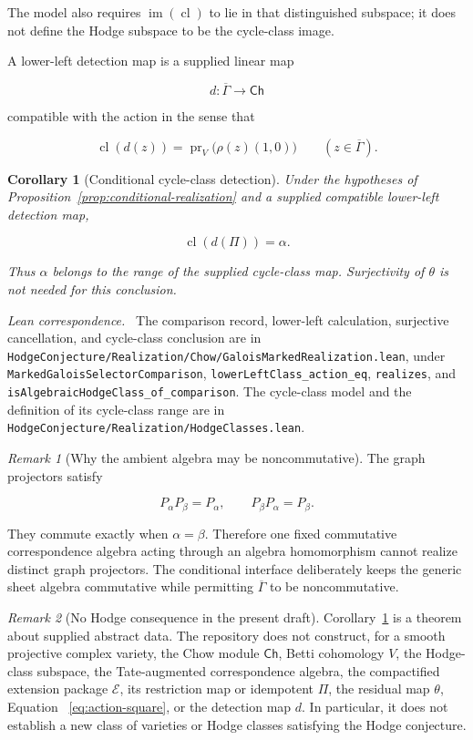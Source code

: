 \documentclass[11pt]{article}
\newtheorem{corollary}[theorem]{Corollary}
\theoremstyle{definition}
\theoremstyle{remark}
\newtheorem*{remark}{Remark}
\newcommand{\Gbar}{\overline{\Gamma}}
\newcommand{\leanpath}[1]{\texttt{\nolinkurl{#1}}}
\newcommand{\chowsrc}[1]{%
  \leanpath{HodgeConjecture/Realization/Chow/#1}}
\newenvironment{leanfiles}
  {\par\medskip\begingroup\footnotesize\raggedright\noindent
   \textit{Lean correspondence.}\ }
  {\par\endgroup\medskip}
\begin{document}
The model also requires
\(\operatorname{im}(\operatorname{cl})\) to lie in that distinguished
subspace; it does not define the Hodge subspace to be the cycle-class image.

A lower-left detection map is a supplied linear map

\[
  d:\Gbar\longrightarrow\mathsf{Ch}
\]

compatible with the action in the sense that

\[
  \operatorname{cl}(d(z))
  =\operatorname{pr}_V\bigl(\rho(z)(1,0)\bigr)
  \qquad(z\in\Gbar).
\]

\begin{corollary}[Conditional cycle-class detection]
\label{cor:conditional-detection}
Under the hypotheses of Proposition~\ref{prop:conditional-realization} and a
supplied compatible lower-left detection map,

\[
  \operatorname{cl}(d(\Pi))=\alpha.
\]

Thus \(\alpha\) belongs to the range of the supplied cycle-class map.
Surjectivity of \(\theta\) is not needed for this conclusion.
\end{corollary}

\begin{leanfiles}
The comparison record, lower-left calculation, surjective cancellation, and
cycle-class conclusion are in \chowsrc{GaloisMarkedRealization.lean}, under
\leanpath{MarkedGaloisSelectorComparison},
\leanpath{lowerLeftClass_action_eq}, \leanpath{realizes}, and
\leanpath{isAlgebraicHodgeClass_of_comparison}.  The cycle-class model and
the definition of its cycle-class range are in
\leanpath{HodgeConjecture/Realization/HodgeClasses.lean}.
\end{leanfiles}

\begin{remark}[Why the ambient algebra may be noncommutative]
The graph projectors satisfy

\[
  P_\alpha P_\beta=P_\alpha,
  \qquad
  P_\beta P_\alpha=P_\beta.
\]

They commute exactly when \(\alpha=\beta\).  Therefore one fixed commutative
correspondence algebra acting through an algebra homomorphism cannot realize
distinct graph projectors.  The conditional interface deliberately keeps
the generic sheet algebra commutative while permitting \(\Gbar\) to be
noncommutative.
\end{remark}

\begin{remark}[No Hodge consequence in the present draft]
Corollary~\ref{cor:conditional-detection} is a theorem about supplied abstract
data.  The repository does not construct, for a smooth projective complex
variety, the Chow module \(\mathsf{Ch}\), Betti cohomology \(V\), the Hodge-class
subspace, the Tate-augmented correspondence algebra, the compactified
extension package \(\mathcal E\), its restriction map or idempotent \(\Pi\),
the residual map \(\theta\), Equation
~\eqref{eq:action-square}, or the detection map \(d\).  In particular, it
does not establish a new class of varieties or Hodge classes satisfying the
Hodge conjecture.
\end{remark}
\end{document}
